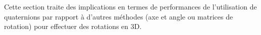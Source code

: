 Cette section traite des implications en termes de performances de l'utilisation de
quaternions par rapport à d'autres méthodes (axe et angle ou matrices de rotation) 
pour effectuer des rotations en 3D.